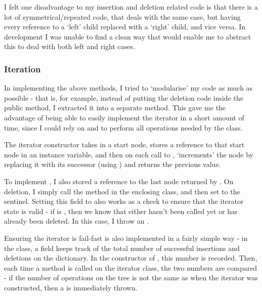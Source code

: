 I felt one disadvantage to my insertion and deletion related code is that there is a lot of symmetrical/repeated code, that deals with the same case, but having every reference to a `left' child replaced with a `right' child, and vice versa. In development I was unable to find a clean way that would enable me to abstract this to deal with both left and right cases.

\subsubsection{Iteration}

In implementing the above methods, I tried to `modularise' my code as much as possible - that is, for example, instead of putting the deletion code inside the public  method, I extracted it into a separate  method. This gave me the advantage of being able to easily implement the iterator in a short amount of time, since I could rely on  and  to perform all operations needed by the  class.

The iterator constructor takes in a start node, stores a reference to that start node in an instance variable, and then on each call to , `increments' the node by replacing it with its successor (using ) and returns the previous value.

To implement , I also stored a reference to the last node returned by . On deletion, I simply call the  method in the enclosing  class, and then set  to the  sentinel. Setting this field to  also works as a check to ensure that the iterator state is valid - if  is , then we know that either  hasn't been called yet or  has already been deleted. In this case, I throw an .

Ensuring the iterator is fail-fast is also implemented in a fairly simple way - in the  class, a field  keeps track of the total number of successful insertions and deletions on the dictionary. In the constructor of , this number is recorded. Then, each time a method is called on the iterator class, the two numbers are compared - if the number of operations on the tree is not the same as when the iterator was constructed, then a  is immediately thrown.

